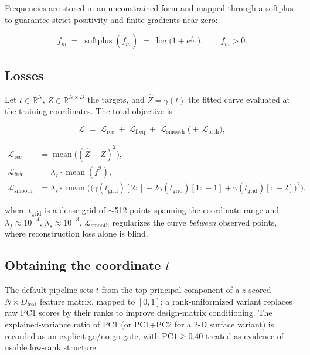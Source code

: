\documentclass[11pt]{article}
\begin{document}
Frequencies are stored in an unconstrained form and mapped through a softplus
to guarantee strict positivity and finite gradients near zero:

\begin{equation}
f_m \;=\; \operatorname{softplus}(\tilde f_m) \;=\; \log\!\big(1 + e^{\tilde f_m}\big), \qquad f_m > 0.
\label{eq:softplus}
\end{equation}

\subsection{Losses}

Let $t \in \mathbb{R}^N$, $Z \in \mathbb{R}^{N \times D}$ the targets, and
$\hat Z = \gamma(t)$ the fitted curve evaluated at the training coordinates.
The total objective is

\begin{equation}
\mathcal{L} \;=\; \mathcal{L}_{\mathrm{rec}} \;+\; \mathcal{L}_{\mathrm{freq}}
\;+\; \mathcal{L}_{\mathrm{smooth}} \;\big(+\, \mathcal{L}_{\mathrm{orth}}\big),
\label{eq:totalloss}
\end{equation}

\begin{align}
\mathcal{L}_{\mathrm{rec}} &= \operatorname{mean}\big( (\hat Z - Z)^2 \big), \label{eq:lrec}\\
\mathcal{L}_{\mathrm{freq}} &= \lambda_f \cdot \operatorname{mean}(f^2), \label{eq:lfreq}\\
\mathcal{L}_{\mathrm{smooth}} &= \lambda_s \cdot \operatorname{mean}
\Big( \big(\gamma(t_{\mathrm{grid}})[2:] - 2\gamma(t_{\mathrm{grid}})[1{:}\!-\!1]
+ \gamma(t_{\mathrm{grid}})[:\!-\!2]\big)^2 \Big), \label{eq:lsmooth}
\end{align}

where $t_{\mathrm{grid}}$ is a dense grid of $\sim$512 points spanning the
coordinate range and $\lambda_f \approx 10^{-4}$, $\lambda_s \approx 10^{-3}$.
$\mathcal{L}_{\mathrm{smooth}}$ regularizes the curve \emph{between} observed
points, where reconstruction loss alone is blind.

\subsection{Obtaining the coordinate $t$}

The default pipeline sets $t$ from the top principal component of a
$z$-scored $N \times D_{\mathrm{feat}}$ feature matrix, mapped to $[0,1]$; a
rank-uniformized variant replaces raw PC1 scores by their ranks to improve
design-matrix conditioning. The explained-variance ratio of PC1 (or
PC1+PC2 for a 2-D surface variant) is recorded as an explicit go/no-go gate,
with $\mathrm{PC1} \geq 0.40$ treated as evidence of usable low-rank
structure.
\end{document}
